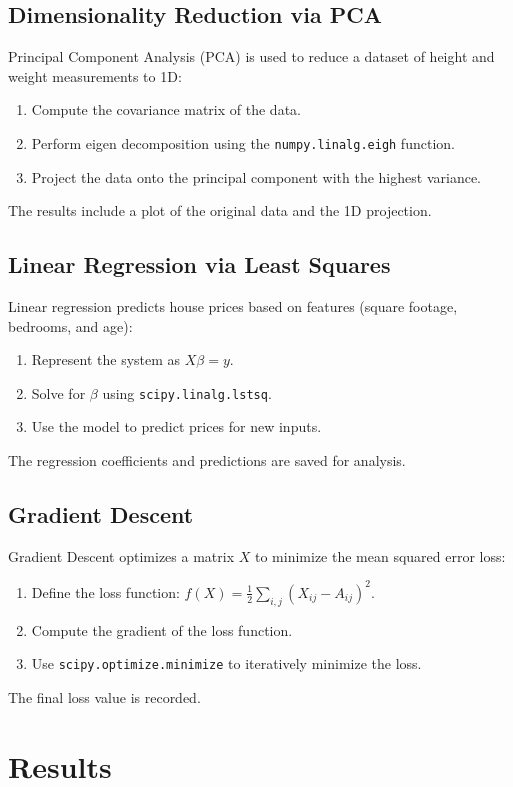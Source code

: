 \documentclass[a4paper,12pt]{article}
\begin{document}
\subsection{Dimensionality Reduction via PCA}
Principal Component Analysis (PCA) is used to reduce a dataset of height and weight measurements to 1D:
\begin{enumerate}
    \item Compute the covariance matrix of the data.
    \item Perform eigen decomposition using the \texttt{numpy.linalg.eigh} function.
    \item Project the data onto the principal component with the highest variance.
\end{enumerate}
The results include a plot of the original data and the 1D projection.

\subsection{Linear Regression via Least Squares}
Linear regression predicts house prices based on features (square footage, bedrooms, and age):
\begin{enumerate}
    \item Represent the system as $X\beta = y$.
    \item Solve for $\beta$ using \texttt{scipy.linalg.lstsq}.
    \item Use the model to predict prices for new inputs.
\end{enumerate}
The regression coefficients and predictions are saved for analysis.

\subsection{Gradient Descent}
Gradient Descent optimizes a matrix $X$ to minimize the mean squared error loss:
\begin{enumerate}
    \item Define the loss function: $f(X) = \frac{1}{2} \sum_{i,j} (X_{ij} - A_{ij})^2$.
    \item Compute the gradient of the loss function.
    \item Use \texttt{scipy.optimize.minimize} to iteratively minimize the loss.
\end{enumerate}
The final loss value is recorded.

\section{Results}
\end{document}
